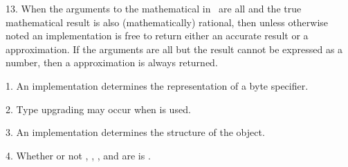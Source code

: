 \item{13.} When the arguments to the mathematical 
in \thenextfigure\ are all  and the true mathematical result
is also (mathematically) rational, then unless otherwise noted
an implementation is free to return either an accurate result 
or a  approximation.
If the arguments are all  
but the result cannot be expressed
as a  number, then a  
approximation is always returned.


\endlist
\endsubSection%


\beginlist
\item{1.}
An implementation determines the representation of a byte specifier.

\item{2.}
Type upgrading may occur when  is used.
\item{3.} An implementation determines the structure of the 
object.     

\item{4.} Whether or not , ,
, and  are
 is .

\endlist
\endsubSection%

\beginlist




